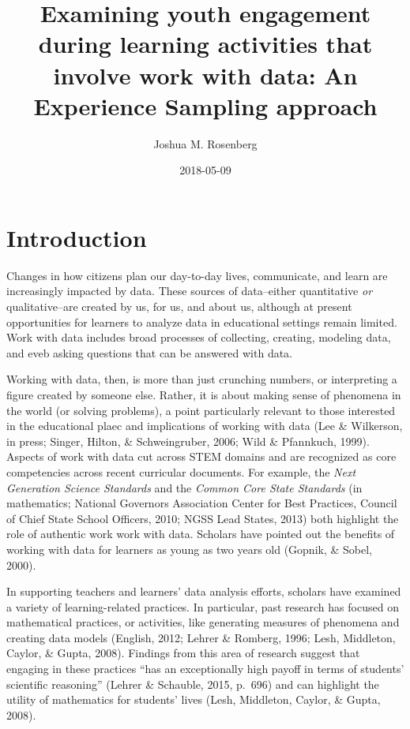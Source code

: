 \documentclass[]{book}
\title{Examining youth engagement during learning activities that involve work
with data: An Experience Sampling approach}
\author{Joshua M. Rosenberg}
\date{2018-05-09}
\theoremstyle{definition}
\theoremstyle{definition}
\theoremstyle{definition}
\theoremstyle{remark}
\begin{document}
\maketitle

{
\setcounter{tocdepth}{1}
\tableofcontents
}
\chapter{Introduction}\label{intro-placemarker}

Changes in how citizens plan our day-to-day lives, communicate, and
learn are increasingly impacted by data. These sources of data--either
quantitative \emph{or} qualitative--are created by us, for us, and about
us, although at present opportunities for learners to analyze data in
educational settings remain limited. Work with data includes broad
processes of collecting, creating, modeling data, and eveb asking
questions that can be answered with data.

Working with data, then, is more than just crunching numbers, or
interpreting a figure created by someone else. Rather, it is about
making sense of phenomena in the world (or solving problems), a point
particularly relevant to those interested in the educational plaec and
implications of working with data (Lee \& Wilkerson, in press; Singer,
Hilton, \& Schweingruber, 2006; Wild \& Pfannkuch, 1999). Aspects of
work with data cut across STEM domains and are recognized as core
competencies across recent curricular documents. For example, the
\emph{Next Generation Science Standards} and the \emph{Common Core State
Standards} (in mathematics; National Governors Association Center for
Best Practices, Council of Chief State School Officers, 2010; NGSS Lead
States, 2013) both highlight the role of authentic work work with data.
Scholars have pointed out the benefits of working with data for learners
as young as two years old (Gopnik, \& Sobel, 2000).

In supporting teachers and learners' data analysis efforts, scholars
have examined a variety of learning-related practices. In particular,
past research has focused on mathematical practices, or activities, like
generating measures of phenomena and creating data models (English,
2012; Lehrer \& Romberg, 1996; Lesh, Middleton, Caylor, \& Gupta, 2008).
Findings from this area of research suggest that engaging in these
practices ``has an exceptionally high payoff in terms of students'
scientific reasoning'' (Lehrer \& Schauble, 2015, p.~696) and can
highlight the utility of mathematics for students' lives (Lesh,
Middleton, Caylor, \& Gupta, 2008).
\end{document}

